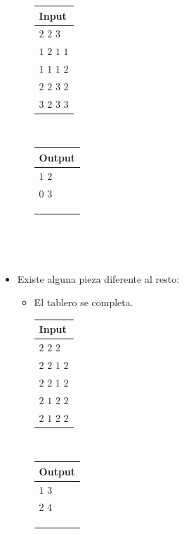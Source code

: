 \documentclass[11pt, a4paper, twoside]{article}
\begin{document}
\begin{itemize}
\begin{itemize}
			\begin{minipage}{0.2\textwidth}
				\begin{tabular}{l}
					Input  \\
					\hline
					$2$ $2$ $3$     \\
					$1$ $2$ $1$ $1$ \\
					$1$ $1$ $1$ $2$ \\
					$2$ $2$ $3$ $2$ \\
					$3$ $2$ $3$ $3$ \\
				\end{tabular} \\  
			\end{minipage}
			\begin{minipage}{0.2\textwidth}	
				\begin{tabular}{l}
					Output  \\
					\hline
					$1$ $2$ \\
					$0$ $3$ \\
					\\
					\\
					\\
				\end{tabular} \\
			\end{minipage} \\
	\end{itemize}
	
\item Existe alguna pieza diferente al resto: 
     \begin{itemize}
		\item El tablero se completa. \\
		
			\begin{minipage}{0.2\textwidth}
				\begin{tabular}{l}
					Input  \\
					\hline
					$2$ $2$ $2$     \\
					$2$ $2$ $1$ $2$ \\
					$2$ $2$ $1$ $2$ \\
					$2$ $1$ $2$ $2$ \\
					$2$ $1$ $2$ $2$ \\
				\end{tabular} \\  
			\end{minipage}
			\begin{minipage}{0.2\textwidth}	
				\begin{tabular}{l}
					Output  \\
					\hline
					$1$ $3$ \\
					$2$ $4$ \\
					\\
					\\
					\\
				\end{tabular} \\
			\end{minipage} \\
		

\end{itemize}
\end{itemize}
\end{document}
